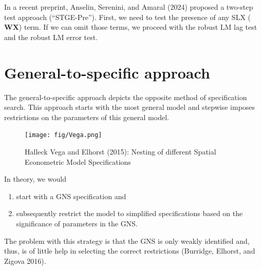 \documentclass[
  letterpaper,
]{scrbook}
\begin{document}
\begin{tcolorbox}[enhanced jigsaw, colframe=quarto-callout-tip-color-frame, coltitle=black, titlerule=0mm, opacitybacktitle=0.6, toprule=.15mm, colbacktitle=quarto-callout-tip-color!10!white, toptitle=1mm, leftrule=.75mm, colback=white, bottomtitle=1mm, opacityback=0, left=2mm, title=\textcolor{quarto-callout-tip-color}{\faLightbulb}\hspace{0.5em}{Potential solution?}, breakable, arc=.35mm, rightrule=.15mm, bottomrule=.15mm]

In a recent preprint, Anselin, Serenini, and Amaral (2024) proposed a
two-step test approach (``STGE-Pre''). First, we need to test the
presence of any SLX
(\(\boldsymbol{\mathbf{W}} \boldsymbol{\mathbf{X}}\)) term. If we can
omit those terms, we proceed with the robust LM lag test and the robust
LM error test.

\end{tcolorbox}

\hypertarget{general-to-specific-approach}{%
\section{General-to-specific
approach}\label{general-to-specific-approach}}

The general-to-specific approach depicts the opposite method of
specification search. This approach starts with the most general model
and stepwise imposes restrictions on the parameters of this general
model.

\begin{figure}

{\centering \texttt{[image: fig/Vega.png]}

}

\caption{Halleck Vega and Elhorst (2015): Nesting of different Spatial
Econometric Model Specifications}

\end{figure}

In theory, we would

\begin{enumerate}
\def\labelenumi{\arabic{enumi})}
\item
  start with a GNS specification and
\item
  subsequently restrict the model to simplified specifications based on
  the significance of parameters in the GNS.
\end{enumerate}

The problem with this strategy is that the GNS is only weakly identified
and, thus, is of little help in selecting the correct restrictions
(Burridge, Elhorst, and Zigova 2016).
\end{document}
